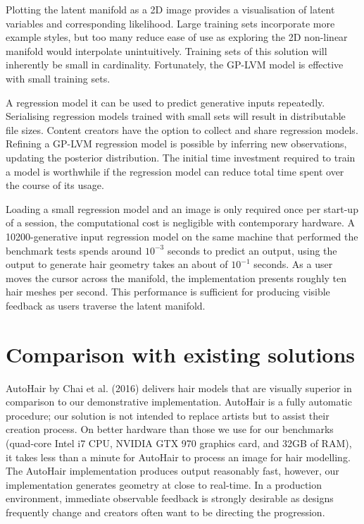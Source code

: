 \documentclass[ %
author={Dillon Keith Diep},
supervisor={Dr. Carl Henrik Ek},
degree={MEng},
title={ART-CG Hair:},
subtitle={Assisted Real-time Content Generation of Stylised Virtual Hair},
type={Research},
year={2017} ]{dissertation}
\begin{document}
Plotting the latent manifold as a 2D image provides a visualisation of latent variables and corresponding likelihood. Large training sets incorporate more example styles, but too many reduce ease of use as exploring the 2D non-linear manifold would interpolate unintuitively. Training sets of this solution will inherently be small in cardinality. Fortunately, the GP-LVM model is effective with small training sets.

A regression model it can be used to predict generative inputs repeatedly. Serialising regression models trained with small sets will result in distributable file sizes. Content creators have the option to collect and share regression models. Refining a GP-LVM regression model is possible by inferring new observations, updating the posterior distribution. The initial time investment required to train a model is worthwhile if the regression model can reduce total time spent over the course of its usage.

Loading a small regression model and an image is only required once per start-up of a session, the computational cost is negligible with contemporary hardware. A 10200-generative input regression model on the same machine that performed the benchmark tests spends around $10^{-3}$ seconds to predict an output, using the output to generate hair geometry takes an about of $10^{-1}$ seconds. As a user moves the cursor across the manifold, the implementation presents roughly ten hair meshes per second. This performance is sufficient for producing visible feedback as users traverse the latent manifold.

\section{Comparison with existing solutions}
AutoHair by Chai et al. (2016) \cite{autohair} delivers hair models that are visually superior in comparison to our demonstrative implementation. AutoHair is a fully automatic procedure; our solution is not intended to replace artists but to assist their creation process. On better hardware than those we use for our benchmarks (quad-core Intel i7 CPU, NVIDIA GTX 970 graphics card, and 32GB of RAM), it takes less than a minute for AutoHair to process an image for hair modelling. The AutoHair implementation produces output reasonably fast, however, our implementation generates geometry at close to real-time. In a production environment, immediate observable feedback is strongly desirable as designs frequently change and creators often want to be directing the progression. 
\end{document}
